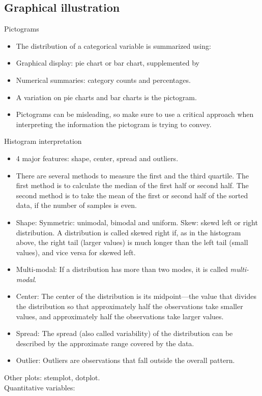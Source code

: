 \documentclass[10pt, a4paper]{article}
\begin{document}
\subsection{Graphical illustration}
Pictograms
\begin{itemize}
\item The distribution of a categorical variable is summarized using:
\item Graphical display: pie chart or bar chart, supplemented by
\item Numerical summaries: category counts and percentages.
\item A variation on pie charts and bar charts is the pictogram.
\item Pictograms can be misleading, so make sure to use a critical approach when interpreting the information the pictogram is trying to convey.
\end{itemize}
Histogram interpretation
\begin{itemize}
\item 4 major features: shape, center, spread and outliers.
\item There are several methods to measure the first and the third quartile. The first method is to calculate the median of the first half or second half. The second method is to take the mean of the first or second half of the sorted data, if the number of samples is even.
\item Shape: Symmetric: unimodal, bimodal and uniform. Skew: skewd left or right distribution. A distribution is called skewed right if, as in the histogram above, the right tail (larger values) is much longer than the left tail (small values), and vice versa for skewed left. 
\item Multi-modal: If a distribution has more than two modes, it is called \emph{multi-modal}.
\item Center: The center of the distribution is its midpoint---the value that divides the distribution so that approximately half the observations take smaller values, and approximately half the observations take larger values.
\item Spread: The spread (also called variability) of the distribution can be described by the approximate range covered by the data.
\item Outlier: Outliers are observations that fall outside the overall pattern.
\end{itemize}
Other plots: stemplot, dotplot.\\
Quantitative variables:\\
\end{document}

